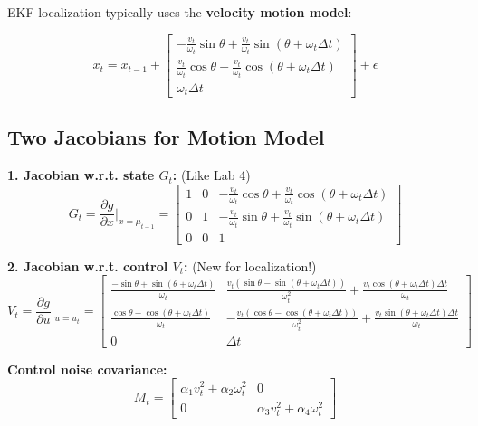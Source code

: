 EKF localization typically uses the \textbf{velocity motion model}:

\begin{equation}
x_t = x_{t-1} + \begin{bmatrix}
-\frac{v_t}{\omega_t}\sin\theta + \frac{v_t}{\omega_t}\sin(\theta + \omega_t\Delta t) \\
\frac{v_t}{\omega_t}\cos\theta - \frac{v_t}{\omega_t}\cos(\theta + \omega_t\Delta t) \\
\omega_t\Delta t
\end{bmatrix} + \epsilon
\end{equation}

\subsection{Two Jacobians for Motion Model}

\textbf{1. Jacobian w.r.t. state $G_t$:} (Like Lab 4)
\begin{equation}
G_t = \frac{\partial g}{\partial x}\bigg|_{x=\mu_{t-1}} = 
\begin{bmatrix} 
1 & 0 & -\frac{v_t}{\omega_t}\cos\theta + \frac{v_t}{\omega_t}\cos(\theta + \omega_t\Delta t) \\
0 & 1 & -\frac{v_t}{\omega_t}\sin\theta + \frac{v_t}{\omega_t}\sin(\theta + \omega_t\Delta t) \\
0 & 0 & 1 
\end{bmatrix}
\end{equation}

\textbf{2. Jacobian w.r.t. control $V_t$:} (New for localization!)
\begin{equation}
V_t = \frac{\partial g}{\partial u}\bigg|_{u=u_t} = 
\begin{bmatrix}
\frac{-\sin\theta + \sin(\theta+\omega_t\Delta t)}{\omega_t} & \frac{v_t(\sin\theta - \sin(\theta+\omega_t\Delta t))}{\omega_t^2} + \frac{v_t\cos(\theta+\omega_t\Delta t)\Delta t}{\omega_t} \\
\frac{\cos\theta - \cos(\theta+\omega_t\Delta t)}{\omega_t} & -\frac{v_t(\cos\theta - \cos(\theta+\omega_t\Delta t))}{\omega_t^2} + \frac{v_t\sin(\theta+\omega_t\Delta t)\Delta t}{\omega_t} \\
0 & \Delta t
\end{bmatrix}
\end{equation}

\textbf{Control noise covariance:}
\begin{equation}
M_t = \begin{bmatrix} 
\alpha_1 v_t^2 + \alpha_2 \omega_t^2 & 0 \\ 
0 & \alpha_3 v_t^2 + \alpha_4 \omega_t^2 
\end{bmatrix}
\end{equation}

